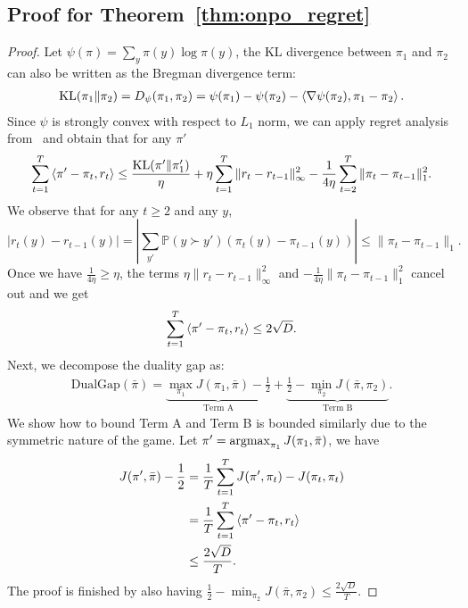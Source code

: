 \subsection{Proof for Theorem~\ref{thm:onpo_regret}}\label{sec:proof_onpo}
\begin{proof}
Let $\psi(\pi)=\sum_{y} \pi(y) \log \pi(y)$, the KL divergence between $\pi_1$ and $\pi_2$ can also be written as the Bregman divergence term:
\begin{align*}
\mathrm{KL}(\pi_1 \Vert \pi_2)=D_{\psi}(\pi_1,\pi_2)=\psi(\pi_1)-\psi(\pi_2)-\left\langle\nabla \psi(\pi_2),\pi_1-\pi_2\right\rangle.
\end{align*}
Since $\psi$ is strongly convex with respect to $L_1$ norm, we can apply regret analysis from~\citet{rakhlin2013optimization,syrgkanis2015fast} and obtain that for any $\pi'$
\begin{align*}
\sum_{t=1}^T \left\langle\pi'-\pi_t,r_t\right\rangle \le \frac{\mathrm{KL}(\pi' \Vert \pi'_1)}{\eta}+\eta \sum_{t=1}^T \|r_t-r_{t-1}\|^2_{\infty}-\frac{1}{4 \eta}\sum_{t=2}^T \|\pi_t-\pi_{t-1}\|_1^2.
\end{align*}
We observe that for any $t \ge 2$ and any $y$, 
$$
|r_t(y)-r_{t-1}(y)|=|\sum_{y'} \mathbb{P}(y \succ y')(\pi_t(y)-\pi_{t-1}(y))| \le \|\pi_t-\pi_{t-1}\|_1.$$
Once we have $\frac{1}{4 \eta} \ge \eta$, the terms $\eta \|r_t-r_{t-1}\|^2_{\infty}$ and $-\frac{1}{4 \eta}\|\pi_t-\pi_{t-1}\|^2_1$ cancel out and we get
\begin{align*}
\sum_{t=1}^T \left\langle\pi'-\pi_t,r_t\right\rangle \le 2 \sqrt{D}.
\end{align*}
Next, we decompose the duality gap as:
\begin{align*}
\mathrm{DualGap}(\bar \pi)=\underbrace{\max_{\pi_1} J(\pi_1,\bar \pi)-\frac{1}{2}}_{\textrm{Term A}}+\underbrace{\frac{1}{2}-\min_{\pi_2}J(\bar \pi, \pi_2)}_{\textrm{Term B}}.
\end{align*}
We show how to bound Term A and Term B is bounded similarly due to the symmetric nature of the game. Let $\pi'=\mathop{\mathrm{argmax}}_{\pi_1} J(\pi_1,\bar \pi)$, we have
\begin{align*}
J(\pi',\bar \pi)-\frac{1}{2}&=\frac{1}{T}\sum_{t=1}^T J(\pi',\pi_t)-J(\pi_t,\pi_t) \\
&=\frac{1}{T}\sum_{t=1}^T \left\langle\pi'-\pi_t,r_t\right\rangle \\
&\le\frac{2\sqrt{D}}{T}.
\end{align*}
The proof is finished by also having $\frac{1}{2}-\min_{\pi_2}J(\bar \pi, \pi_2) \le \frac{2\sqrt{D}}{T}$.
\end{proof}
